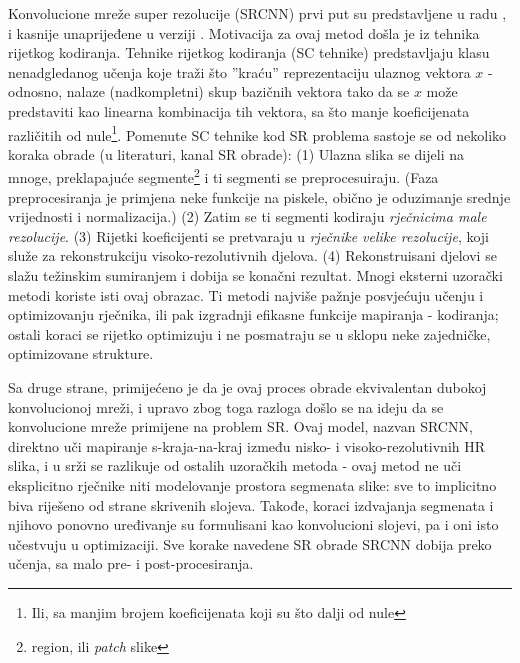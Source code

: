 \documentclass[12pt]{report}
\numberwithin{equation}{section}
\begin{document}
Konvolucione mreže super rezolucije (SRCNN) prvi put su predstavljene u radu \cite{earlier} , i kasnije unaprijeđene u verziji \cite{main}. Motivacija za ovaj metod došla je iz tehnika rijetkog kodiranja. Tehnike rijetkog kodiranja (SC tehnike) \cite{sparse} predstavljaju klasu nenadgledanog učenja koje traži što ''kraću'' reprezentaciju ulaznog vektora $x$ - odnosno, nalaze (nadkompletni) skup bazičnih vektora tako da se $x$ može predstaviti kao linearna kombinacija tih vektora, sa što manje koeficijenata različitih od nule\footnote{Ili, sa manjim brojem koeficijenata koji su što dalji od nule}. Pomenute SC tehnike kod SR problema \cite{sparse1} sastoje se od nekoliko koraka obrade (u literaturi, kanal SR obrade): (1) Ulazna slika se dijeli na mnoge, preklapajuće segmente\footnote{region, ili \textit{patch} slike} i ti segmenti se preprocesuiraju. (Faza preprocesiranja je primjena neke funkcije na piskele, obično je oduzimanje srednje vrijednosti i normalizacija.) (2) Zatim se ti segmenti kodiraju \textit{rječnicima male rezolucije}. (3) Rijetki koeficijenti se pretvaraju u \textit{rječnike velike rezolucije}, koji služe za rekonstrukciju visoko-rezolutivnih djelova. (4) Rekonstruisani djelovi se slažu težinskim sumiranjem i dobija se konačni rezultat. Mnogi eksterni uzorački metodi koriste isti ovaj obrazac. Ti metodi najviše pažnje posvjećuju učenju i optimizovanju rječnika, ili pak izgradnji efikasne funkcije mapiranja - kodiranja; ostali koraci se rijetko optimizuju i ne posmatraju se u sklopu neke zajedničke, optimizovane strukture.  


Sa druge strane, primijećeno je da je ovaj proces obrade ekvivalentan dubokoj konvolucionoj mreži, i upravo zbog toga razloga došlo se na ideju da se konvolucione mreže primijene na problem SR. Ovaj model, nazvan SRCNN, direktno uči mapiranje s-kraja-na-kraj između nisko- i visoko-rezolutivnih HR slika, i u srži se razlikuje od ostalih uzoračkih metoda - ovaj metod ne uči eksplicitno rječnike niti modelovanje prostora segmenata slike: sve to implicitno biva riješeno od strane skrivenih slojeva. Takođe, koraci izdvajanja segmenata i njihovo ponovno uređivanje su formulisani kao konvolucioni slojevi, pa i oni isto učestvuju u optimizaciji. Sve korake navedene SR obrade SRCNN dobija preko učenja, sa malo pre- i post-procesiranja. 
\end{document}
